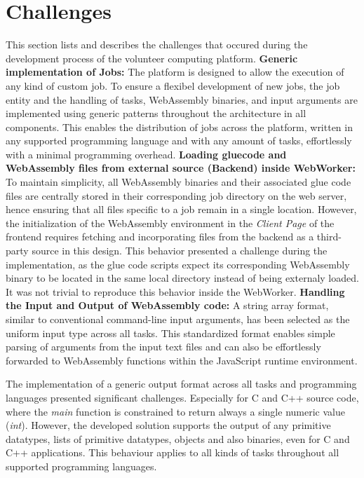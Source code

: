 \section{Challenges}
\label{sec:implementation:challenges}
This section lists and describes the  challenges that occured during the development process of the volunteer computing platform.
\newline
\newline
\textbf{Generic implementation of Jobs:}
\newline
The platform is designed to allow the execution of any kind of custom job. To ensure a flexibel development of new jobs, the job entity and the handling of tasks, WebAssembly binaries, and input arguments are implemented using generic patterns throughout the architecture in all components. This enables the distribution of jobs across the platform, written in any supported programming language and with any amount of tasks, effortlessly with a minimal programming overhead.
\newline
\newline
\textbf{Loading gluecode and WebAssembly files from external source (Backend) inside WebWorker:}
\newline
To maintain simplicity, all WebAssembly binaries and their associated glue code files are centrally stored in their corresponding job directory on the web server, hence ensuring that all files specific to a job remain in a single location. However, the initialization of the WebAssembly environment in the \emph{Client Page} of the frontend requires fetching and incorporating files from the backend as a third-party source in this design. This behavior presented a challenge during the implementation, as the glue code scripts expect its corresponding WebAssembly binary to be located in the same local directory instead of being externaly loaded. It was not trivial to reproduce this behavior inside the WebWorker.
\newline
\newline
\textbf{Handling the Input and Output of WebAssembly code:}
\newline
A string array format, similar to conventional command-line input arguments, has been selected as the uniform input type across all tasks. This standardized format enables simple parsing of arguments from the input text files and can also be effortlessly forwarded to WebAssembly functions within the JavaScript runtime environment.

The implementation of a generic output format across all tasks and programming languages presented significant challenges. Especially for C and C++ source code, where the \emph{main} function is constrained to return always a single numeric value (\emph{int}). However, the developed solution supports the output of any primitive datatypes, lists of primitive datatypes, objects and also binaries, even for C and C++ applications. This behaviour applies to all kinds of tasks throughout all supported programming languages.

